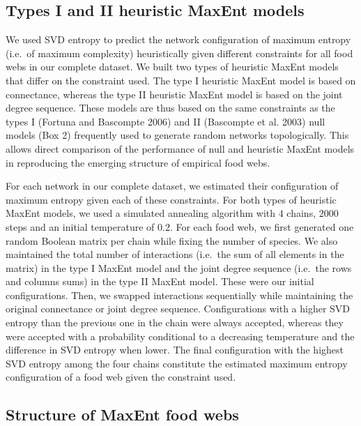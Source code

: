 \documentclass[11pt]{article}
\begin{document}
\hypertarget{types-i-and-ii-heuristic-maxent-models}{%
\subsection{Types I and II heuristic MaxEnt
models}\label{types-i-and-ii-heuristic-maxent-models}}

We used SVD entropy to predict the network configuration of maximum
entropy (i.e.~of maximum complexity) heuristically given different
constraints for all food webs in our complete dataset. We built two
types of heuristic MaxEnt models that differ on the constraint used. The
type I heuristic MaxEnt model is based on connectance, whereas the type
II heuristic MaxEnt model is based on the joint degree sequence. These
models are thus based on the same constraints as the types I (Fortuna
and Bascompte 2006) and II (Bascompte et al. 2003) null models (Box 2)
frequently used to generate random networks topologically. This allows
direct comparison of the performance of null and heuristic MaxEnt models
in reproducing the emerging structure of empirical food webs.

For each network in our complete dataset, we estimated their
configuration of maximum entropy given each of these constraints. For
both types of heuristic MaxEnt models, we used a simulated annealing
algorithm with \(4\) chains, \(2000\) steps and an initial temperature
of \(0.2\). For each food web, we first generated one random Boolean
matrix per chain while fixing the number of species. We also maintained
the total number of interactions (i.e.~the sum of all elements in the
matrix) in the type I MaxEnt model and the joint degree sequence
(i.e.~the rows and columns sums) in the type II MaxEnt model. These were
our initial configurations. Then, we swapped interactions sequentially
while maintaining the original connectance or joint degree sequence.
Configurations with a higher SVD entropy than the previous one in the
chain were always accepted, whereas they were accepted with a
probability conditional to a decreasing temperature and the difference
in SVD entropy when lower. The final configuration with the highest SVD
entropy among the four chains constitute the estimated maximum entropy
configuration of a food web given the constraint used.

\hypertarget{structure-of-maxent-food-webs}{%
\subsection{Structure of MaxEnt food
webs}\label{structure-of-maxent-food-webs}}
\end{document}
